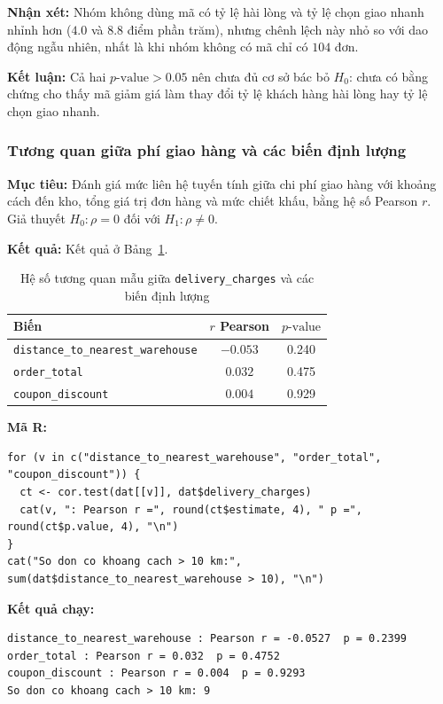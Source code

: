 \textbf{Nhận xét:} Nhóm không dùng mã có tỷ lệ hài lòng và tỷ lệ chọn giao nhanh nhỉnh hơn ($4.0$ và $8.8$ điểm phần trăm), nhưng chênh lệch này nhỏ so với dao động ngẫu nhiên, nhất là khi nhóm không có mã chỉ có $104$ đơn.

\textbf{Kết luận:} Cả hai $p\text{-value} > 0.05$ nên chưa đủ cơ sở bác bỏ $H_0$: chưa có bằng chứng cho thấy mã giảm giá làm thay đổi tỷ lệ khách hàng hài lòng hay tỷ lệ chọn giao nhanh.

\subsubsection{Tương quan giữa phí giao hàng và các biến định lượng}\label{sec:pearson}
\textbf{Mục tiêu:} Đánh giá mức liên hệ tuyến tính giữa chi phí giao hàng với khoảng cách đến kho, tổng giá trị đơn hàng và mức chiết khấu, bằng hệ số Pearson $r$. Giả thuyết $H_0: \rho = 0$ đối với $H_1: \rho \ne 0$.

\textbf{Kết quả:} Kết quả ở Bảng~\ref{tab:pearson}.
\begin{table}[H]
    \centering
    \begin{tabular}{|l|c|c|}
    \hline
    \textbf{Biến} & \textbf{$r$ Pearson} & $p\text{-value}$ \\ \hline
    \texttt{distance\_to\_nearest\_warehouse} & $-0.053$ & 0.240 \\ \hline
    \texttt{order\_total} & $0.032$ & 0.475 \\ \hline
    \texttt{coupon\_discount} & $0.004$ & 0.929 \\ \hline
    \end{tabular}
    \caption{Hệ số tương quan mẫu giữa \texttt{delivery\_charges} và các biến định lượng}
    \label{tab:pearson}
\end{table}

\textbf{Mã R:}
\begin{lstlisting}
for (v in c("distance_to_nearest_warehouse", "order_total", "coupon_discount")) {
  ct <- cor.test(dat[[v]], dat$delivery_charges)
  cat(v, ": Pearson r =", round(ct$estimate, 4), " p =", round(ct$p.value, 4), "\n")
}
cat("So don co khoang cach > 10 km:", sum(dat$distance_to_nearest_warehouse > 10), "\n")
\end{lstlisting}
\textbf{Kết quả chạy:}
\begin{lstlisting}[style=rout]
distance_to_nearest_warehouse : Pearson r = -0.0527  p = 0.2399 
order_total : Pearson r = 0.032  p = 0.4752 
coupon_discount : Pearson r = 0.004  p = 0.9293 
So don co khoang cach > 10 km: 9 
\end{lstlisting}

